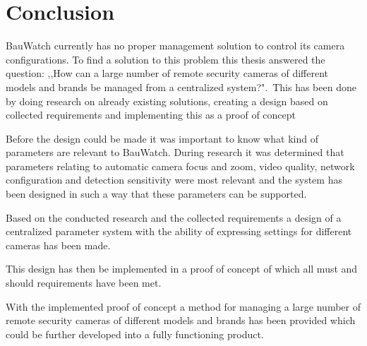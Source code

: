 \chapter{Conclusion}
%

BauWatch currently has no proper management solution to control its camera configurations.
To find a solution to this problem this thesis answered the question: ,,How can a large number of remote security cameras of different models and brands be managed from a centralized system?". This has been done by doing research on already existing solutions, creating a design based on collected requirements and implementing this as a proof of concept

Before the design could be made it was important to know what kind of parameters are relevant to BauWatch.
During research it was determined that parameters relating to automatic camera focus and zoom, video quality, network configuration and detection sensitivity were most relevant and the system has been designed in such a way that these parameters can be supported.

Based on the conducted research and the collected requirements a design of a centralized parameter system with the ability of expressing settings for different cameras has been made.

This design has then be implemented in a proof of concept of which all must and should requirements have been met.

With the implemented proof of concept a method for managing a large number of remote security cameras of different models and brands has been provided which could be further developed into a fully functioning product.

